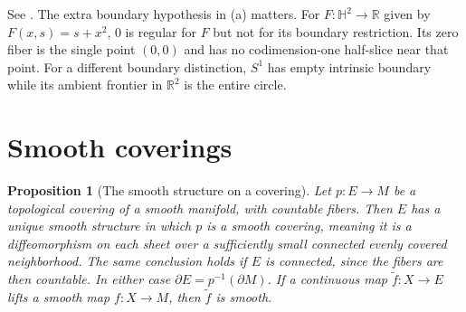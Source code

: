 \documentclass[11pt,oneside,openany]{book}
\newtheorem{proposition}[theorem]{Proposition}
\theoremstyle{definition}
\theoremstyle{remark}
\newcommand{\R}{\mathbb R}
\newcommand{\HH}{\mathbb H}
\begin{document}
See \cite[Proposition~5.47, Theorem~5.48, and Problem~5-23]{lee}.
The extra boundary hypothesis in (a) matters. For
\(F:\HH^2\to\R\) given by \(F(x,s)=s+x^2\), \(0\)
is regular for \(F\) but not for its boundary restriction.
Its zero fiber is the single point \((0,0)\) and
has no codimension-one half-slice near that point.
For a different boundary distinction, \(S^1\)
has empty intrinsic boundary while its ambient
frontier in \(\R^2\) is the entire circle.

\section{Smooth coverings}

\begin{proposition}[The smooth structure on a covering]\label{p104:M03.07}
Let \(p:E\to M\) be a topological covering of a
smooth manifold, with countable fibers. Then \(E\)
has a unique smooth structure in which \(p\) is
a smooth covering, meaning it is a diffeomorphism
on each sheet over a sufficiently small connected
evenly covered neighborhood. The same conclusion
holds if \(E\) is connected, since the fibers
are then countable. In either case
\(\partial E=p^{-1}(\partial M)\). If a continuous
map \(\tilde f:X\to E\) lifts a smooth map
\(f:X\to M\), then \(\tilde f\) is smooth.
\end{proposition}
\end{document}
